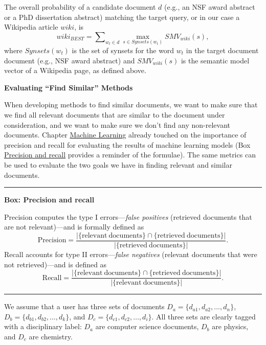 \documentclass[]{krantz}
\begin{document}
The overall probability of a candidate document \(d\) (e.g., an NSF
award abstract or a PhD dissertation abstract) matching the target
query, or in our case a Wikipedia article \(wiki\), is
\[wiki_{BEST}=\sum\nolimits_{w_t\in d} \max_{s\in Synsets(w_t)} SMV_{wiki}(s),\]
where \(Synsets(w_t)\) is the set of synsets for the word \(w_t\) in the
target document document (e.g., NSF award abstract) and
\(SMV_{wiki}(s)\) is the semantic model vector of a Wikipedia page, as
defined above.

\textbf{Evaluating ``Find Similar'' Methods}

When developing methods to find similar documents, we want to make sure
that we find all relevant documents that are similar to the document
under consideration, and we want to make sure we don't find any
non-relevant documents. Chapter \protect\hyperlink{chap:ml}{Machine
Learning} already touched on the importance of precision and recall for
evaluating the results of machine learning models (Box
\protect\hyperlink{box:text2}{Precision and recall} provides a reminder
of the formulae). The same metrics can be used to evaluate the two goals
we have in finding relevant and similar documents.

\begin{center}\rule{0.5\linewidth}{\linethickness}\end{center}

\textbf{Box: Precision and recall}

Precision computes the type I errors---\emph{false positives} (retrieved
documents that are not relevant)---and is formally defined as
\[\mathrm{Precision} = \frac{|\{\mathrm{relevant\ documents}\}\cap \{\mathrm{retrieved\ documents}\}|}{|\{\mathrm{retrieved\ documents}\}|}.\]
Recall accounts for type II errors---\emph{false negatives} (relevant
documents that were not retrieved)---and is defined as
\[\mathrm{Recall}=\frac{|\{\mathrm{relevant\ documents}\}\cap \{\mathrm{retrieved\ documents}\}|}{|\{\mathrm{relevant\ documents}\}|}.\]

\begin{center}\rule{0.5\linewidth}{\linethickness}\end{center}

We assume that a user has three sets of documents
\(D_a =\{d_{a1},d_{a2},\ldots, d_n\}\),
\(D_b=\{d_{b1}, d_{b2}, \ldots, d_k\}\), and
\(D_c =\{d_{c1},d_{c2},\ldots,d_i\}\). All three sets are clearly tagged
with a disciplinary label: \(D_a\) are computer science documents,
\(D_b\) are physics, and \(D_c\) are chemistry.
\end{document}
